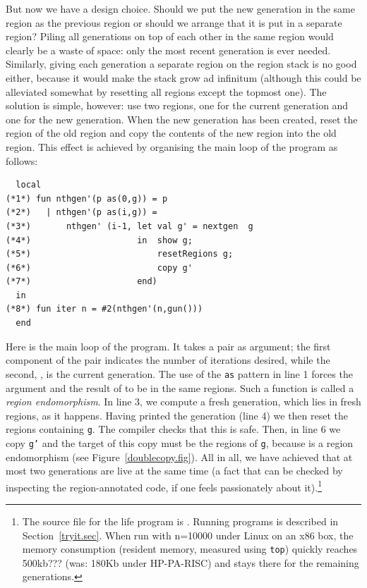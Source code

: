 \documentclass[12pt]{book}
\begin{document}
But now we have a design choice. Should we put the new generation in
the same region as the previous region or should we arrange that it is
put in a separate region? Piling all generations on top of each other
in the same region would clearly be a waste of space: only the most
recent generation is ever needed. Similarly, giving each generation a
separate region on the region stack is no good either, because it
would make the stack grow ad infinitum (although this could be
alleviated somewhat by resetting all regions except the topmost one).
The solution is simple, however: use two regions, one for the current
generation and one for the new generation. When the new generation has
been created, reset the region of the old region and copy the contents
of the new region into the old region. This effect is achieved by
organising the main loop of the program as follows:
\begin{verbatim}
  local 
(*1*) fun nthgen'(p as(0,g)) = p 
(*2*)   | nthgen'(p as(i,g)) = 
(*3*)       nthgen' (i-1, let val g' = nextgen  g
(*4*)                     in  show g;
(*5*)                         resetRegions g;
(*6*)                         copy g'
(*7*)                     end)
  in 
(*8*) fun iter n = #2(nthgen'(n,gun()))
  end
\end{verbatim}
Here  
%
is the main loop of the program. It takes a pair as argument; the
first component of the pair indicates the number of iterations
desired, while the second, , is the current generation. The
use of the {\tt as} pattern in line 1 forces the argument and the
result of  to be in the same regions. Such a function
is called a
%
{\em region endomorphism}. In line 3, we compute a fresh generation,
which lies in fresh regions, as it happens. Having printed the
generation (line 4) we then reset the regions containing {\tt g}. The
compiler checks that this is safe. Then, in line 6 we copy {\tt g'}
and the target of this copy must be the regions of {\tt g}, because
 is a region endomorphism (see
Figure~\ref{doublecopy.fig}).  All in all, we have achieved that at
most two generations are live at the same time (a fact that can be
checked by inspecting the region-annotated code, if one feels
passionately about it).\footnote{The source file for the life program
  is . Running
  programs is described in Section~\ref{tryit.sec}. When run with
  n=10000 under Linux on an x86 box, the memory consumption (resident
  memory, measured using {\tt top}) quickly reaches 500kb??? (was:
  180Kb under HP-PA-RISC) and stays there for the remaining
  generations.}
\end{document}

